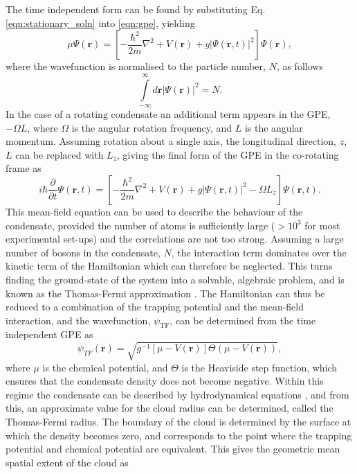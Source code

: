 The time independent form can be found by substituting Eq. \eqref{eqn:stationary_soln} into \eqref{eqn:gpe}, yielding
\begin{equation}
\mu\Psi(\textbf{r}) = \left[-\frac{\hbar^2}{2m}\nabla^2 + V(\textbf{r}) + g\vert\Psi(\textbf{r},t)\vert^2 \right]\Psi(\textbf{r}),
\end{equation}
where the wavefunction is normalised to the particle number, $N$, as follows
\begin{equation}\label{eqn:norm}
\displaystyle\int\limits_{-\infty}^{\infty}d\textbf{r} \left\vert \Psi\left(\textbf{r}\right) \right\vert^2 = N.
\end{equation}
In the case of a rotating condensate an additional term appears in the GPE, $-\Omega L$, where $\Omega$ is the angular rotation frequency, and $L$ is the angular momentum. Assuming rotation about a single axis, the longitudinal direction, $z$, $L$ can be replaced with $L_z$, giving the final form of the GPE in the co-rotating frame as
\begin{equation}\label{eqn:gpe_rotation}
i\hbar\frac{\partial}{\partial t}\Psi(\textbf{r},t) = \left[-\frac{\hbar^2}{2m}\nabla^2 + V(\textbf{r}) + g\vert\Psi(\textbf{r},t)\vert^2 - \Omega L_z  \right]\Psi(\textbf{r},t).
\end{equation}
This mean-field equation can be used to describe the behaviour of the condensate, provided the number of atoms is sufficiently large ($>10^3$ for most experimental set-ups) and the correlations are not too strong. Assuming a large number of bosons in the condensate, $N$, the interaction term dominates over the kinetic term of the Hamiltonian which can therefore be neglected. This turns finding the ground-state of the system into a solvable, algebraic problem, and is known as the Thomas-Fermi approximation \cite[~p. 84]{BK:Ueda_2010}. The Hamiltonian can thus be reduced to a combination of the trapping potential and the mean-field interaction, and the wavefunction, $\psi_{\textrm{TF}}$, can be determined from the time independent GPE as
\begin{equation}
\psi_{TF}(\textbf{r}) = \sqrt{ g^{-1}[\mu - V(\textbf{r})] \Theta(\mu - V(\textbf{r}))},
\end{equation}
where $\mu$ is the chemical potential, and $\Theta$ is the Heaviside step function, which ensures that the condensate density does not become negative. Within this regime the condensate can be described by hydrodynamical equations \cite[Pg.~180]{BK:Pitaevskii_Stringari_2003}, and from this, an approximate value for the cloud radius can be determined, called the Thomas-Fermi radius. The boundary of the cloud is determined by the surface at which the density becomes zero, and corresponds to the point where the trapping potential and chemical potential are equivalent. This gives the geometric mean spatial extent of the cloud \cite[~p. 169]{BK:Pethick_Smith_2008} as
